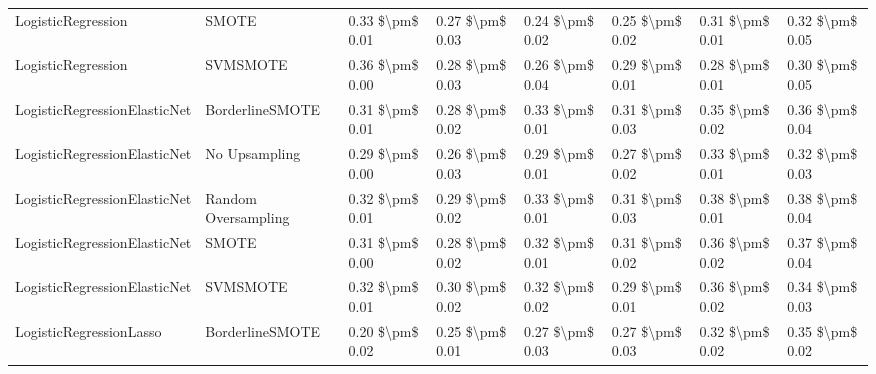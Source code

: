 \begin{tabular}{llllllll}
             LogisticRegression &                         SMOTE &     0.33 \$\textbackslash pm\$ 0.01 &           0.27 \$\textbackslash pm\$ 0.03 &       0.24 \$\textbackslash pm\$ 0.02 &        0.25 \$\textbackslash pm\$ 0.02 &                         0.31 \$\textbackslash pm\$ 0.01 & 0.32 \$\textbackslash pm\$ 0.05 \\
             LogisticRegression &                      SVMSMOTE &     0.36 \$\textbackslash pm\$ 0.00 &           0.28 \$\textbackslash pm\$ 0.03 &       0.26 \$\textbackslash pm\$ 0.04 &        0.29 \$\textbackslash pm\$ 0.01 &                         0.28 \$\textbackslash pm\$ 0.01 & 0.30 \$\textbackslash pm\$ 0.05 \\
   LogisticRegressionElasticNet &               BorderlineSMOTE &     0.31 \$\textbackslash pm\$ 0.01 &           0.28 \$\textbackslash pm\$ 0.02 &       0.33 \$\textbackslash pm\$ 0.01 &        0.31 \$\textbackslash pm\$ 0.03 &                         0.35 \$\textbackslash pm\$ 0.02 & 0.36 \$\textbackslash pm\$ 0.04 \\
   LogisticRegressionElasticNet &                 No Upsampling &     0.29 \$\textbackslash pm\$ 0.00 &           0.26 \$\textbackslash pm\$ 0.03 &       0.29 \$\textbackslash pm\$ 0.01 &        0.27 \$\textbackslash pm\$ 0.02 &                         0.33 \$\textbackslash pm\$ 0.01 & 0.32 \$\textbackslash pm\$ 0.03 \\
   LogisticRegressionElasticNet &           Random Oversampling &     0.32 \$\textbackslash pm\$ 0.01 &           0.29 \$\textbackslash pm\$ 0.02 &       0.33 \$\textbackslash pm\$ 0.01 &        0.31 \$\textbackslash pm\$ 0.03 &                         0.38 \$\textbackslash pm\$ 0.01 & 0.38 \$\textbackslash pm\$ 0.04 \\
   LogisticRegressionElasticNet &                         SMOTE &     0.31 \$\textbackslash pm\$ 0.00 &           0.28 \$\textbackslash pm\$ 0.02 &       0.32 \$\textbackslash pm\$ 0.01 &        0.31 \$\textbackslash pm\$ 0.02 &                         0.36 \$\textbackslash pm\$ 0.02 & 0.37 \$\textbackslash pm\$ 0.04 \\
   LogisticRegressionElasticNet &                      SVMSMOTE &     0.32 \$\textbackslash pm\$ 0.01 &           0.30 \$\textbackslash pm\$ 0.02 &       0.32 \$\textbackslash pm\$ 0.02 &        0.29 \$\textbackslash pm\$ 0.01 &                         0.36 \$\textbackslash pm\$ 0.02 & 0.34 \$\textbackslash pm\$ 0.03 \\
        LogisticRegressionLasso &               BorderlineSMOTE &     0.20 \$\textbackslash pm\$ 0.02 &           0.25 \$\textbackslash pm\$ 0.01 &       0.27 \$\textbackslash pm\$ 0.03 &        0.27 \$\textbackslash pm\$ 0.03 &                         0.32 \$\textbackslash pm\$ 0.02 & 0.35 \$\textbackslash pm\$ 0.02 \\

\end{tabular}
